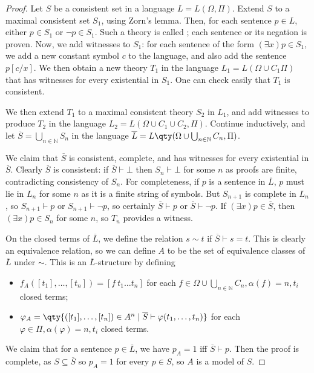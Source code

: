 \begin{proof}
    Let $S$ be a consistent set in a language $L = L(\Omega, \Pi)$.
    Extend $S$ to a maximal consistent set $S_1$, using Zorn's lemma.
    Then, for each sentence $p \in L$, either $p \in S_1$ or $\neg p \in S_1$.
    Such a theory is called ; each sentence or its negation is proven.
    Now, we add witnesses to $S_1$: for each sentence of the form $(\exists x)p \in S_1$, we add a new constant symbol $c$ to the language, and also add the sentence $p[c/x]$.
    We then obtain a new theory $T_1$ in the language $L_1 = L(\Omega \cup C_1 \Pi)$ that has witnesses for every existential in $S_1$.
    One can check easily that $T_1$ is consistent.

    We then extend $T_1$ to a maximal consistent theory $S_2$ in $L_1$, and add witnesses to produce $T_2$ in the language $L_2 = L(\Omega \cup C_1 \cup C_2, \Pi)$.
    Continue inductively, and let $\overline S = \bigcup_{n \in \mathbb N} S_n$ in the language $\overline L = L\qty(\Omega \cup \bigcup_{n \in \mathbb N} C_n, \Pi)$.

    We claim that $\overline S$ is consistent, complete, and has witnesses for every existential in $\overline S$.
    Clearly $\overline S$ is consistent: if $\overline S \vdash \bot$ then $S_n \vdash \bot$ for some $n$ as proofs are finite, contradicting consistency of $S_n$.
    For completeness, if $p$ is a sentence in $\overline L$, $p$ must lie in $L_n$ for some $n$ as it is a finite string of symbols.
    But $S_{n+1}$ is complete in $L_n$, so $S_{n+1} \vdash p$ or $S_{n+1} \vdash \neg p$, so certainly $\overline S \vdash p$ or $\overline S \vdash \neg p$.
    If $(\exists x)p \in \overline S$, then $(\exists x)p \in S_n$ for some $n$, so $T_n$ provides a witness.

    On the closed terms of $\overline L$, we define the relation $s \sim t$ if $\overline S \vdash s = t$.
    This is clearly an equivalence relation, so we can define $A$ to be the set of equivalence classes of $\overline L$ under $\sim$.
    This is an $\overline L$-structure by defining
    \begin{itemize}
        \item $f_A([t_1], \dots, [t_n]) = [f\ t_1 \dots t_n]$ for each $f \in \Omega \cup \bigcup_{n \in \mathbb N} C_n, \alpha(f) = n, t_i$ closed terms;
        \item $\varphi_A = \qty{([t_1], \dots, [t_n]) \in A^n \mid \overline S \vdash \varphi(t_1, \dots, t_n)}$ for each $\varphi \in \Pi, \alpha(\varphi) = n, t_i$ closed terms.
    \end{itemize}
    We claim that for a sentence $p \in \overline L$, we have $p_A = 1$ iff $\overline S \vdash p$.
    Then the proof is complete, as $S \subseteq \overline S$ so $p_A = 1$ for every $p \in S$, so $A$ is a model of $S$.


\end{proof}
